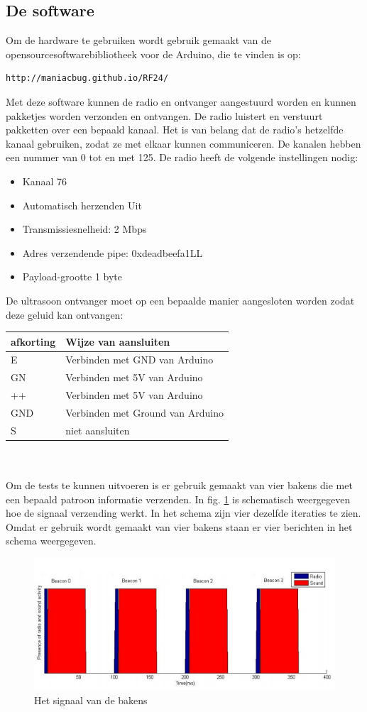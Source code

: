 \documentclass{article}
\begin{document}
\subsection{De software}
Om de hardware te gebruiken wordt gebruik gemaakt van de opensourcesoftwarebibliotheek voor de Arduino, die te vinden is op: \begin{verbatim}http://maniacbug.github.io/RF24/ \end{verbatim} 
Met deze software kunnen de radio en ontvanger aangestuurd worden en kunnen pakketjes worden verzonden en ontvangen. De radio luistert en verstuurt pakketten over een bepaald kanaal. Het is van belang dat de radio's hetzelfde kanaal gebruiken, zodat ze met elkaar kunnen communiceren. De kanalen hebben een nummer van 0 tot en met 125. De radio heeft de volgende instellingen nodig:
\begin{itemize}
	\item Kanaal 76 
	\item Automatisch herzenden Uit
	\item Transmissiesnelheid: 2 Mbps
	\item Adres verzendende pipe: 0xdeadbeefa1LL
	\item Payload-grootte 1 byte
\end{itemize}
De ultrasoon ontvanger moet op een bepaalde manier aangesloten worden zodat deze geluid kan ontvangen:
\newline
\begin{tabular}{l| l}
\hline
afkorting & Wijze van aansluiten \\ \hline
E & Verbinden met GND van Arduino \\
GN & Verbinden met 5V van Arduino \\
++ & Verbinden met 5V van Arduino \\
GND & Verbinden met Ground van Arduino \\
S & niet aansluiten \\
\end{tabular}
\\
\\
Om de tests te kunnen uitvoeren is er gebruik gemaakt van vier bakens die met een bepaald patroon informatie verzenden. In fig.  \ref{uitzenden_bakens} is schematisch weergegeven hoe de signaal verzending werkt. In het schema zijn vier dezelfde iteraties te zien. Omdat er gebruik wordt gemaakt van vier bakens staan er vier berichten in het schema weergegeven. 
\begin{figure}[h]
\centering\includegraphics[]{berichten_bakens.png}
\caption{Het signaal van de bakens}
\label{uitzenden_bakens}
\end{figure}
\end{document}

